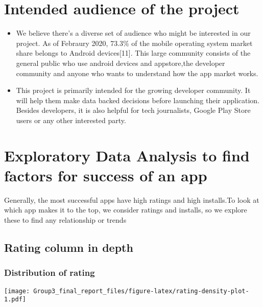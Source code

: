 \documentclass[
]{article}
\begin{document}
\hypertarget{intended-audience-of-the-project}{%
\section{Intended audience of the
project}\label{intended-audience-of-the-project}}

\begin{itemize}
\item
  We believe there's a diverse set of audience who might be interested
  in our project. As of Febraury 2020, 73.3\% of the mobile operating
  system market share belongs to Android devices{[}11{]}. This large
  community consists of the general public who use android devices and
  appstore,the developer community and anyone who wants to understand
  how the app market works.
\item
  This project is primarily intended for the growing developer
  community. It will help them make data backed decisions before
  launching their application. Besides developers, it is also helpful
  for tech journalists, Google Play Store users or any other interested
  party.
\end{itemize}

\hypertarget{exploratory-data-analysis-to-find-factors-for-success-of-an-app}{%
\section{Exploratory Data Analysis to find factors for success of an
app}\label{exploratory-data-analysis-to-find-factors-for-success-of-an-app}}

Generally, the most successful apps have high ratings and high
installs.To look at which app makes it to the top, we consider ratings
and installs, so we explore these to find any relationship or trends

\hypertarget{rating-column-in-depth}{%
\subsection{Rating column in depth}\label{rating-column-in-depth}}

\hypertarget{distribution-of-rating}{%
\subsubsection{Distribution of rating}\label{distribution-of-rating}}

\texttt{[image: Group3\_final\_report\_files/figure-latex/rating-density-plot-1.pdf]}
\end{document}
